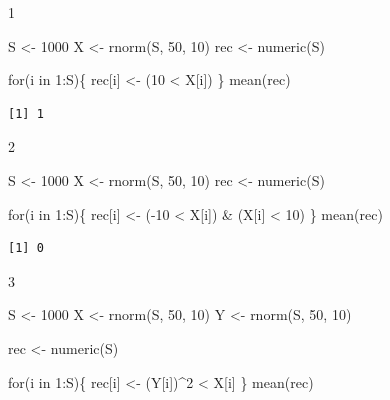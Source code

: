 \documentclass[
  letterpaper,
  DIV=11,
  numbers=noendperiod]{scrartcl}
\newenvironment{Shaded}{\begin{snugshade}}{\end{snugshade}}
\newcommand{\ControlFlowTok}[1]{\textcolor[rgb]{0.00,0.23,0.31}{#1}}
\newcommand{\DecValTok}[1]{\textcolor[rgb]{0.68,0.00,0.00}{#1}}
\newcommand{\FunctionTok}[1]{\textcolor[rgb]{0.28,0.35,0.67}{#1}}
\newcommand{\NormalTok}[1]{\textcolor[rgb]{0.00,0.23,0.31}{#1}}
\newcommand{\OtherTok}[1]{\textcolor[rgb]{0.00,0.23,0.31}{#1}}
\newcommand{\SpecialCharTok}[1]{\textcolor[rgb]{0.37,0.37,0.37}{#1}}
\begin{document}
1

\begin{Shaded}
\begin{Highlighting}[]
\NormalTok{S }\OtherTok{\textless{}{-}} \DecValTok{1000}
\NormalTok{X }\OtherTok{\textless{}{-}} \FunctionTok{rnorm}\NormalTok{(S, }\DecValTok{50}\NormalTok{, }\DecValTok{10}\NormalTok{)}
\NormalTok{rec }\OtherTok{\textless{}{-}} \FunctionTok{numeric}\NormalTok{(S)}

\ControlFlowTok{for}\NormalTok{(i }\ControlFlowTok{in} \DecValTok{1}\SpecialCharTok{:}\NormalTok{S)\{}
\NormalTok{  rec[i] }\OtherTok{\textless{}{-}}\NormalTok{ (}\DecValTok{10} \SpecialCharTok{\textless{}}\NormalTok{ X[i])}
\NormalTok{\}}
\FunctionTok{mean}\NormalTok{(rec)}
\end{Highlighting}
\end{Shaded}

\begin{verbatim}
[1] 1
\end{verbatim}

2

\begin{Shaded}
\begin{Highlighting}[]
\NormalTok{S }\OtherTok{\textless{}{-}} \DecValTok{1000}
\NormalTok{X }\OtherTok{\textless{}{-}} \FunctionTok{rnorm}\NormalTok{(S, }\DecValTok{50}\NormalTok{, }\DecValTok{10}\NormalTok{)}
\NormalTok{rec }\OtherTok{\textless{}{-}} \FunctionTok{numeric}\NormalTok{(S)}

\ControlFlowTok{for}\NormalTok{(i }\ControlFlowTok{in} \DecValTok{1}\SpecialCharTok{:}\NormalTok{S)\{}
\NormalTok{  rec[i] }\OtherTok{\textless{}{-}}\NormalTok{ (}\SpecialCharTok{{-}}\DecValTok{10} \SpecialCharTok{\textless{}}\NormalTok{ X[i]) }\SpecialCharTok{\&}\NormalTok{ (X[i] }\SpecialCharTok{\textless{}} \DecValTok{10}\NormalTok{)}
\NormalTok{\}}
\FunctionTok{mean}\NormalTok{(rec)}
\end{Highlighting}
\end{Shaded}

\begin{verbatim}
[1] 0
\end{verbatim}

3

\begin{Shaded}
\begin{Highlighting}[]
\NormalTok{S }\OtherTok{\textless{}{-}} \DecValTok{1000}
\NormalTok{X }\OtherTok{\textless{}{-}} \FunctionTok{rnorm}\NormalTok{(S, }\DecValTok{50}\NormalTok{, }\DecValTok{10}\NormalTok{)}
\NormalTok{Y }\OtherTok{\textless{}{-}} \FunctionTok{rnorm}\NormalTok{(S, }\DecValTok{50}\NormalTok{, }\DecValTok{10}\NormalTok{)}

\NormalTok{rec }\OtherTok{\textless{}{-}} \FunctionTok{numeric}\NormalTok{(S)}

\ControlFlowTok{for}\NormalTok{(i }\ControlFlowTok{in} \DecValTok{1}\SpecialCharTok{:}\NormalTok{S)\{}
\NormalTok{  rec[i] }\OtherTok{\textless{}{-}}\NormalTok{ (Y[i])}\SpecialCharTok{\^{}}\DecValTok{2} \SpecialCharTok{\textless{}}\NormalTok{ X[i]}
\NormalTok{\}}
\FunctionTok{mean}\NormalTok{(rec)}
\end{Highlighting}
\end{Shaded}
\end{document}
